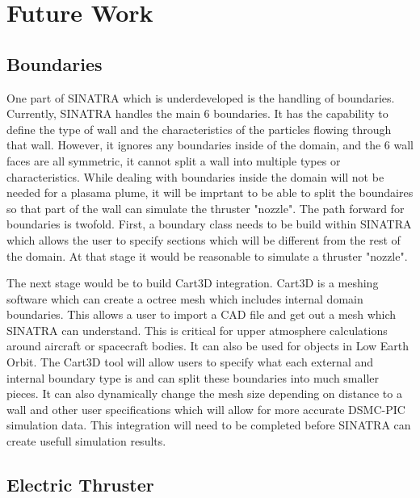 \section{Future Work}

\subsection{Boundaries}

One part of SINATRA which is underdeveloped is the handling of boundaries. Currently, SINATRA handles the main 6 boundaries. It has the capability to define the type of wall and the characteristics of the particles flowing through that wall. However, it ignores any boundaries inside of the domain, and the 6 wall faces are all symmetric, it cannot split a wall into multiple types or characteristics. While dealing with boundaries inside the domain will not be needed for a plasama plume, it will be imprtant to be able to split the boundaires so that part of the wall can simulate the thruster "nozzle". The path forward for boundaries is twofold. First, a boundary class needs to be build within SINATRA which allows the user to specify sections which will be different from the rest of the domain. At that stage it would be reasonable to simulate a thruster "nozzle". \par

\indent The next stage would be to build Cart3D integration. Cart3D is a meshing software which can create a octree mesh which includes internal domain boundaries. This allows a user to import a CAD file and get out a mesh which SINATRA can understand. This is critical for upper atmosphere calculations around aircraft or spacecraft bodies. It can also be used for objects in Low Earth Orbit. The Cart3D tool will allow users to specify what each external and internal boundary type is and can split these boundaries into much smaller pieces. It can also dynamically change the mesh size depending on distance to a wall and other user specifications which will allow for more accurate DSMC-PIC simulation data. This integration will need to be completed before SINATRA can create usefull simulation results. \par

\subsection{Electric Thruster}

